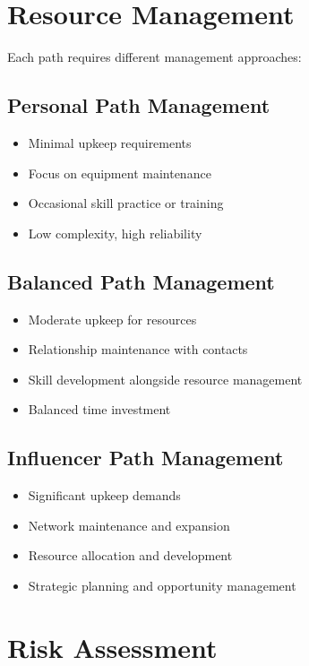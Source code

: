 \documentclass[11pt,twoside,openany]{book}
\begin{document}
\section*{Resource Management} 

Each path requires different management approaches:

\subsection*{Personal Path Management}

\begin{itemize}
\item Minimal upkeep requirements
\item Focus on equipment maintenance
\item Occasional skill practice or training
\item Low complexity, high reliability
\end{itemize}

\subsection*{Balanced Path Management}

\begin{itemize}
\item Moderate upkeep for resources
\item Relationship maintenance with contacts
\item Skill development alongside resource management
\item Balanced time investment
\end{itemize}

\subsection*{Influencer Path Management}

\begin{itemize}
\item Significant upkeep demands
\item Network maintenance and expansion
\item Resource allocation and development
\item Strategic planning and opportunity management
\end{itemize}

\section*{Risk Assessment} 
\end{document}
